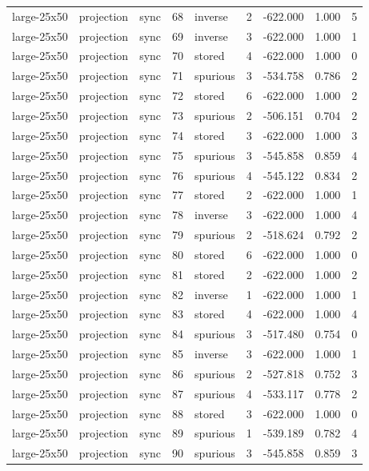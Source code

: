 \begin{tabular}{lllrlrrrr}
large-25x50 & projection & sync & 68 & inverse & 2 & -622.000 & 1.000 & 5 \\
large-25x50 & projection & sync & 69 & inverse & 3 & -622.000 & 1.000 & 1 \\
large-25x50 & projection & sync & 70 & stored & 4 & -622.000 & 1.000 & 0 \\
large-25x50 & projection & sync & 71 & spurious & 3 & -534.758 & 0.786 & 2 \\
large-25x50 & projection & sync & 72 & stored & 6 & -622.000 & 1.000 & 2 \\
large-25x50 & projection & sync & 73 & spurious & 2 & -506.151 & 0.704 & 2 \\
large-25x50 & projection & sync & 74 & stored & 3 & -622.000 & 1.000 & 3 \\
large-25x50 & projection & sync & 75 & spurious & 3 & -545.858 & 0.859 & 4 \\
large-25x50 & projection & sync & 76 & spurious & 4 & -545.122 & 0.834 & 2 \\
large-25x50 & projection & sync & 77 & stored & 2 & -622.000 & 1.000 & 1 \\
large-25x50 & projection & sync & 78 & inverse & 3 & -622.000 & 1.000 & 4 \\
large-25x50 & projection & sync & 79 & spurious & 2 & -518.624 & 0.792 & 2 \\
large-25x50 & projection & sync & 80 & stored & 6 & -622.000 & 1.000 & 0 \\
large-25x50 & projection & sync & 81 & stored & 2 & -622.000 & 1.000 & 2 \\
large-25x50 & projection & sync & 82 & inverse & 1 & -622.000 & 1.000 & 1 \\
large-25x50 & projection & sync & 83 & stored & 4 & -622.000 & 1.000 & 4 \\
large-25x50 & projection & sync & 84 & spurious & 3 & -517.480 & 0.754 & 0 \\
large-25x50 & projection & sync & 85 & inverse & 3 & -622.000 & 1.000 & 1 \\
large-25x50 & projection & sync & 86 & spurious & 2 & -527.818 & 0.752 & 3 \\
large-25x50 & projection & sync & 87 & spurious & 4 & -533.117 & 0.778 & 2 \\
large-25x50 & projection & sync & 88 & stored & 3 & -622.000 & 1.000 & 0 \\
large-25x50 & projection & sync & 89 & spurious & 1 & -539.189 & 0.782 & 4 \\
large-25x50 & projection & sync & 90 & spurious & 3 & -545.858 & 0.859 & 3 \\

\end{tabular}
